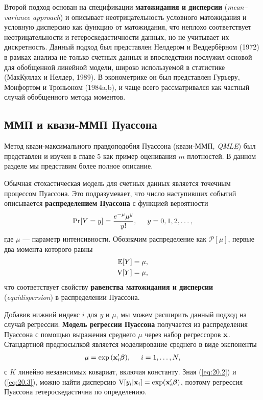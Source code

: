 Второй подход основан на спецификации \textbf{матожидания и дисперсии} (\textit{mean--variance approach}) и описывает неотрицательность условного матожидания и условную дисперсию как функцию от матожидания, что неплохо соответствует неотрицательности и гетероскедастичности данных, но не учитывает их дискретность. Данный подход был представлен Нелдером и Веддербёрном (1972) в рамках анализа не только счетных данных и впоследствии послужил основой для обобщенной линейной модели, широко используемой в статистике (МакКуллах и Нелдер, 1989). В эконометрике он был представлен Гурьеру, Монфортом и Троньоном (1984a,b), и чаще всего рассматривался как частный случай обобщенного метода моментов.


\subsection{ММП и квази-ММП Пуассона}\label{sec:20.2.2}

\noindent
Метод квази-максимального правдоподобия Пуассона (квази-ММП, \textit{QMLE}) был представлен и изучен в главе 5 %
как пример оценивания $m$ плотностей. В данном разделе мы представим более полное описание.

Обычная стохастическая модель для счетных данных является точечным процессом Пуассона. Это подразумевает, что число наступивших событий описывается \textbf{распределением Пуассона} с функцией вероятности
    \begin{align}\label{eq:20.1}
    \Pr [Y=y]=\frac{e^{-\mu}\mu^y}{y!}, \hspace{0.5cm} y=0,1,2,\ldots ,
    \end{align}
где $\mu$ --- параметр интенсивности. Обозначим распределение как $\mathcal{P}[\mu]$, первые два момента которого равны
    \begin{align}\label{eq:20.2}
    \E[Y] = \mu, \\
    \V[Y] = \mu, \notag
    \end{align}
что соответствует свойству \textbf{равенства матожидания и дисперсии} (\textit{equidispersion}) в распределении Пуассона.

Добавив нижний индекс $i$ для $y$ и $\mu$, мы можем расширить данный подход на случай регрессии. \textbf{Модель регрессии Пуассона} получается из распределения Пуассона с помощью выражения среднего $\mu$ через набор регрессоров $\x$. Стандартной предпосылкой является моделирование среднего в виде экспоненты
    \begin{align}\label{eq:20.3}
    \mu = \exp{(\xib)}, \hspace{0.5cm} i=1,\ldots ,N,
    \end{align}
с $K$ линейно независимых ковариат, включая константу. Зная (\ref{eq:20.2}) и (\ref{eq:20.3}), можно найти дисперсию $\V[y_i|\x_i] = \exp(\xib)$, поэтому регрессия Пуассона гетероскедастична по определению.

